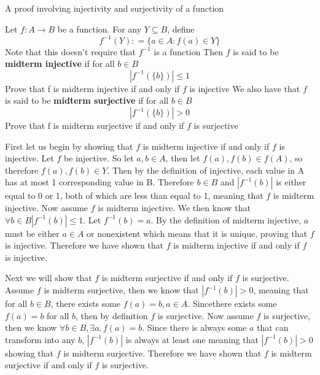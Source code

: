 A proof involving injectivity and surjectivity of a function

Let $f: A\rightarrow B$ be a function. For any $Y \subseteq B$, define
$$ f^{-1}(Y): = \{a \in A: f(a) \in Y\} $$
Note that this doesn't require that $f^{-1}$ is a function
Then $f$ is said to be \textbf{midterm injective} if for all $b \in B$
$$|f^{-1} (\{b\})| \leq 1 $$
Prove that f is midterm injective if and only if $f$ is injective
We also have that $f$ is said to be \textbf{midterm surjective} if for all $b \in B$
$$| f^{-1}(\{b\})| > 0 $$
Prove that f is midterm surjective if and only if $f$ is surjective

\begin{solution}
First let us begin by showing that $f$ is midterm injective if and only if $f$ is injective.
Let $f$ be injective. So let $a,b \in A$, then let $f(a),f(b) \in f(A)$, so therefore $f(a),f(b) \in Y$. Then by the definition of injective, each value in A has at most 1 corresponding value in B. Therefore $b\in B$ and $|f^{-1} (b)|$ is either equal to 0 or 1, both of which are less than equal to 1, meaning that $f$ is midterm injective.
Now assume $f$ is midterm injective. We then know that $\forall b \in B  |f^{-1} (b)| \leq 1$. Let $f^{-1} (b) = a$. By the definition of midterm injective, $a$ must be either $a \in A$ or nonexistent which means that it is unique, proving that $f$ is injective. Therefore we have shown that $f$ is midterm injective if and only if $f$ is injective.

Next we will show that $f$ is midterm surjective if and only if $f$ is surjective. Assume $f$ is midterm surjective, then we know that $|f^{-1} (b)|  > 0$, meaning that for all $b \in B$, there exists some $f(a) = b, a \in A$. Sincethere exists some $f(a) = b$ for all $b$, then by definition $f$ is surjective.
Now assume $f$ is surjective, then we know $\forall b \in B, \exists a , f(a) = b$. Since there is always some $a$ that can transform into any $b$, $|f^{-1} (b)|$ is always at least one meaning that $|f^{-1} (b)| > 0$ showing that $f$ is midterm surjective.
Therefore we have shown that $f$ is midterm surjective if and only if $f$ is surjective.
\end{solution}